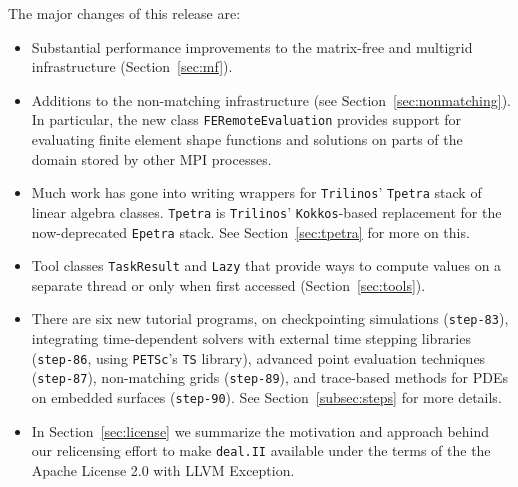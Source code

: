 \documentclass{ansarticle-preprint}
\newcommand{\specialword}[1]{\texttt{#1}}
\newcommand{\dealii}{{\specialword{deal.II}}\xspace}
\newcommand{\trilinos}{{\specialword{Trilinos}}\xspace}
\newcommand{\petsc}{\specialword{PETSc}\xspace}
\newcommand{\ts}{{\specialword{TS}}\xspace}
\newcommand{\kokkos}{{\specialword{Kokkos}}\xspace}
\newcommand{\step}[1]{{\specialword{step-#1}}\xspace}
\newcommand{\epetra}{{\specialword{Epetra}}\xspace}
\newcommand{\tpetra}{{\specialword{Tpetra}}\xspace}
\begin{document}
The major changes of this release are:
%
\begin{itemize}
  \item
    Substantial performance improvements to the matrix-free and multigrid
    infrastructure (Section~\ref{sec:mf}).
  \item
    Additions to the non-matching infrastructure (see
    Section~\ref{sec:nonmatching}). In particular, the new class
    \texttt{FERemoteEvaluation} provides support for evaluating finite
    element shape functions and solutions on parts of the domain stored by
    other MPI processes.
  \item
    Much work has gone into writing wrappers for \trilinos' \tpetra{} stack
    of linear algebra classes. \tpetra{} is \trilinos' \kokkos-based
    replacement for the now-deprecated \epetra{} stack. See
    Section~\ref{sec:tpetra} for more on this.
  \item
    Tool classes \texttt{TaskResult} and \texttt{Lazy} that provide ways to
    compute values on a separate thread or only when first accessed
    (Section~\ref{sec:tools}).
  \item
    There are six new tutorial programs, on checkpointing simulations
    (\step{83}), integrating time-dependent solvers with external time
    stepping libraries (\step{86}, using \petsc's \ts{} library), advanced
    point evaluation techniques (\step{87}), non-matching grids (\step{89}),
    and trace-based methods for PDEs on embedded surfaces (\step{90}). See
    Section~\ref{subsec:steps} for more details.
  \item
    In Section~\ref{sec:license} we summarize the motivation and approach
    behind our relicensing effort to make \dealii available under the terms
    of the the Apache License 2.0 with LLVM Exception.
\end{itemize}
%
\end{document}
